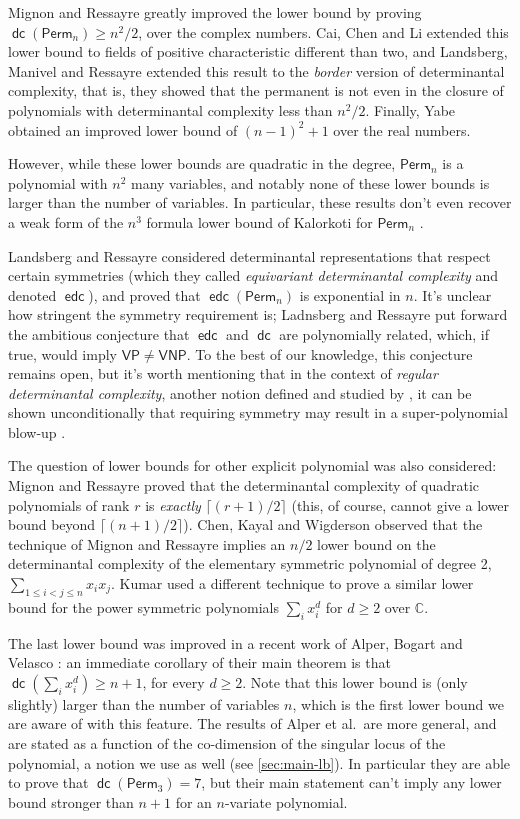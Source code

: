 \documentclass[10pt,a4paper]{article}
\newcommand{\VP}{\mathsf{VP}}
\newcommand{\VNP}{\mathsf{VNP}}
\newcommand{\CC}{\mathbb{C}}
\newcommand{\Perm}{\mathsf{Perm}}
\DeclareMathOperator{\dc}{\mathsf{dc}}
\DeclareMathOperator{\edc}{\mathsf{edc}}
\begin{document}
Mignon and Ressayre \cite{MR04} greatly improved the lower bound by proving $\dc(\Perm_n) \ge n^2/2$, over the complex numbers. Cai, Chen and Li \cite{CCL10} extended this lower bound to fields of positive characteristic different than two, and Landsberg, Manivel and Ressayre \cite{LMR13} extended this result to the \emph{border} version of determinantal complexity, that is, they showed that the permanent is not even in the closure of polynomials with determinantal complexity less than $n^2/2$. Finally, Yabe \cite{Yabe} obtained an improved lower bound of $(n-1)^2+1$ over the real numbers.

However, while these lower bounds are quadratic in the degree, $\Perm_n$ is a polynomial with $n^2$ many variables, and notably none of these lower bounds is larger than the number of variables. In particular, these results don't even recover a weak form of the $n^3$ formula lower bound of Kalorkoti for $\Perm_n$ \cite{K85}.

Landsberg and Ressayre \cite{LR17} considered determinantal representations that respect certain symmetries (which they called \emph{equivariant determinantal complexity} and denoted $\edc$), and proved that $\edc(\Perm_n)$ is exponential in $n$. It's unclear how stringent the symmetry requirement is; Ladnsberg and Ressayre put forward the ambitious conjecture that $\edc$ and $\dc$ are polynomially related, which, if true, would imply $\VP \neq \VNP$. To the best of our knowledge, this conjecture remains open, but it's worth mentioning that in the context of \emph{regular determinantal complexity}, another notion defined and studied by \cite{LR17}, it can be shown unconditionally that requiring symmetry may result in a super-polynomial blow-up \cite{IL17}.

The question of lower bounds for other explicit polynomial was also considered: Mignon and Ressayre \cite{MR04} proved that the determinantal complexity of quadratic polynomials of rank $r$ is \emph{exactly} $\lceil (r+1)/2 \rceil$ (this, of course, cannot give a lower bound beyond $\lceil (n +1)/2 \rceil$). Chen, Kayal and Wigderson \cite{CKW11} observed that the technique of Mignon and Ressayre implies an $n/2$ lower bound on the determinantal complexity of the elementary symmetric polynomial of degree 2, $\sum_{1 \le i < j \le n} x_i x_j$. Kumar \cite{K19} used a different technique to prove a similar lower bound for the power symmetric polynomials $\sum_i x_i^d$ for $d \ge 2$ over $\CC$.

The last lower bound was improved in a recent work of Alper, Bogart and Velasco \cite{ABV17}: an immediate corollary of their main theorem is that $\dc \left( \sum_i x_i^d \right) \ge n+1$, for every $d \ge 2$. Note that this lower bound is (only slightly) larger than the number of variables $n$, which is the first lower bound we are aware of with this feature. The results of Alper et al.\ are more general, and are stated as a function of the co-dimension of the singular locus of the polynomial, a notion we use as well (see \autoref{sec:main-lb}). In particular they are able to prove that $\dc(\Perm_3)=7$, but their main statement can't imply any lower bound stronger than $n+1$ for an $n$-variate polynomial.
\end{document}
